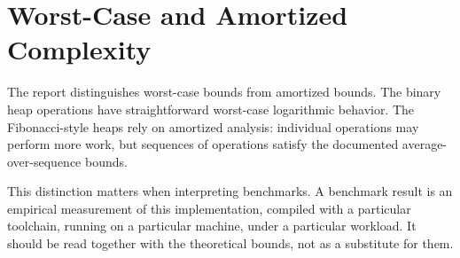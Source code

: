 \section{Worst-Case and Amortized Complexity}

The report distinguishes worst-case bounds from amortized bounds.
The binary heap operations have straightforward worst-case logarithmic behavior.
The Fibonacci-style heaps rely on amortized analysis: individual operations may perform more work, but sequences of operations satisfy the documented average-over-sequence bounds.

This distinction matters when interpreting benchmarks.
A benchmark result is an empirical measurement of this implementation, compiled with a particular toolchain, running on a particular machine, under a particular workload.
It should be read together with the theoretical bounds, not as a substitute for them.
